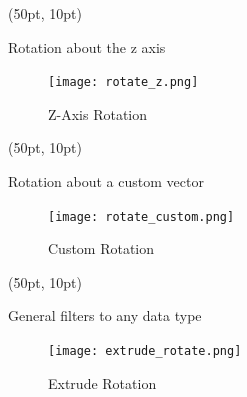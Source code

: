 \documentclass[aspectratio=169,12pt]{beamer}
\begin{document}
\begin{frame}[fragile]
\begin{textblock*}{350pt}(50pt, 10pt)
\begin{block}{Rotation about the z axis}
\end{block}

\begin{figure}
\texttt{[image: rotate\_z.png]}
\caption{Z-Axis Rotation}
\end{figure}
\end{textblock*}
\end{frame}

\begin{frame}[fragile]
\begin{textblock*}{350pt}(50pt, 10pt)
\begin{block}{Rotation about a custom vector}
\end{block}

\begin{figure}
\texttt{[image: rotate\_custom.png]}
\caption{Custom Rotation}
\end{figure}
\end{textblock*}
\end{frame}

\begin{frame}[fragile]
\begin{textblock*}{350pt}(50pt, 10pt)
\begin{block}{General filters to any data type}

\begin{figure}
\texttt{[image: extrude\_rotate.png]}
\caption{Extrude Rotation\label{ExtrudeRotateFigure}}
\end{figure}
\end{block}
\end{textblock*}
\end{frame}
\end{document}
